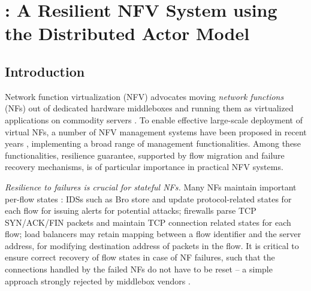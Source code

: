 \chapter {\nfactor: A Resilient NFV System using the Distributed Actor Model}
\label{ch:nfvactor}

\section{Introduction}

Network function virtualization (NFV) advocates moving
{\em network functions} (NFs) out of dedicated hardware middleboxes and running them as virtualized applications on commodity servers \cite{nfv-white-paper}. To enable effective large-scale deployment of virtual NFs, a number of NFV management systems have been proposed in recent years \cite{palkar2015e2, OpenBox, sekar2012design, anderson2012xomb, gember2012stratos, zhang2016opennetvm}, implementing a broad range of management functionalities. Among these functionalities, resilience guarantee, supported by flow migration and failure recovery mechanisms, is of particular importance in practical NFV systems.


{\em Resilience to failures \cite{sherry2015rollback,rajagopalan2013pico} is crucial for stateful NFs.}  Many NFs maintain important per-flow states \cite{EnablingNF}: IDSs such as Bro \cite{bro} store and update protocol-related states for each flow for issuing alerts for potential attacks; firewalls \cite{firewall} parse TCP SYN/ACK/FIN packets and maintain TCP connection related states for each flow; load balancers \cite{lvs} may retain mapping between a flow identifier and the server address, for modifying destination address of packets in the flow. It is critical to ensure correct recovery of flow states in case of NF failures, such that the connections handled by the failed NFs do not have to be reset -- a simple approach strongly rejected by middlebox vendors \cite{sherry2015rollback}.

